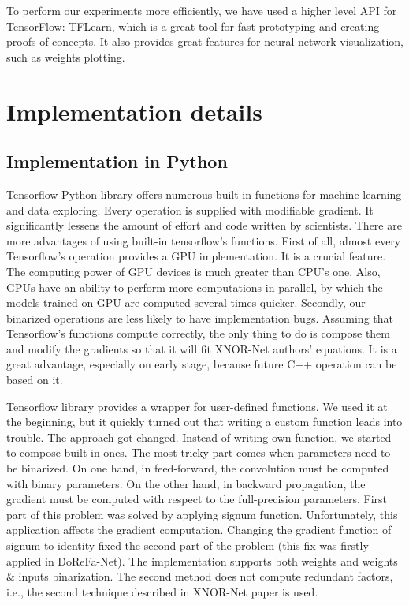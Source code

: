 \documentclass[licencjacka]{pracamgr}
\begin{document}
		To perform our experiments more efficiently, we have used a higher level API for TensorFlow: TFLearn, which is a great tool for fast prototyping and creating proofs of concepts. It also provides great features for neural network visualization, such as weights plotting.

\chapter{Implementation details}

\section{Implementation in Python}

Tensorflow Python library offers numerous built-in functions for machine learning and data exploring. Every operation is supplied with modifiable gradient. It significantly lessens the amount of effort and code written by  scientists. There are more advantages of using built-in tensorflow's functions. First of all, almost every Tensorflow’s operation provides a GPU implementation. It is a crucial feature. The computing power of GPU devices is much greater than CPU's one. Also, GPUs have an ability to perform more computations in parallel, by which the models trained on GPU are computed several times quicker. Secondly, our binarized operations are less likely to have implementation bugs. Assuming that Tensorflow’s functions compute correctly, the only thing to do is compose them and modify the gradients so that it will fit XNOR-Net authors' equations. It is a great advantage, especially on early stage, because future C++ operation can be based on it.
		 
Tensorflow library provides a wrapper for user-defined functions. We used it at the beginning, but it quickly turned out that writing a custom function leads into trouble. The approach got changed. Instead of writing own function, we started to compose built-in ones. The most tricky part comes when parameters need to be binarized. On one hand, in feed-forward, the convolution must be computed with binary parameters. On the other hand, in backward propagation, the gradient must be computed with respect to the full-precision parameters. First part of this problem was solved by applying signum function. Unfortunately, this application affects the gradient computation. Changing the gradient function of signum to identity fixed the second part of the problem (this fix was firstly applied in DoReFa-Net). The implementation supports both weights and weights \& inputs binarization. The second method does not compute redundant factors, i.e., the second technique described in XNOR-Net paper \cite{xnornet} is used.
\end{document}
